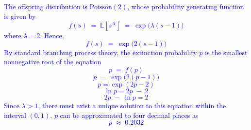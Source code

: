 \documentclass{article}
\begin{document}
\textcolor{blue}{
The offspring distribution is $\mathrm{Poisson}(2)$, whose probability generating function is given by
\[
f(s) \;=\; \mathbb{E}[s^X] \;=\; \exp\bigl(\lambda (s - 1)\bigr)
\]
where $\lambda = 2$. Hence,
\[
f(s) \;=\; \exp\bigl(2(s - 1)\bigr)
\]
By standard branching process theory, the extinction probability $p$ is the smallest nonnegative root of the equation
\[
p \;=\; f(p)
\]
\[
p \;=\; \exp\bigl(2(p - 1)\bigr)
\]
$$p = \exp{(2p - 2)}$$
$$\ln p = 2p \;-\; 2$$
$$2p \;-\; \ln p = 2$$
Since $\lambda > 1$, there must exist a unique solution to this equation within the interval $(0,1)$. 
$p$ can be approximated to four decimal places as
\[
p \;\approx\; 0.2032
\]
}
%
\end{document}
